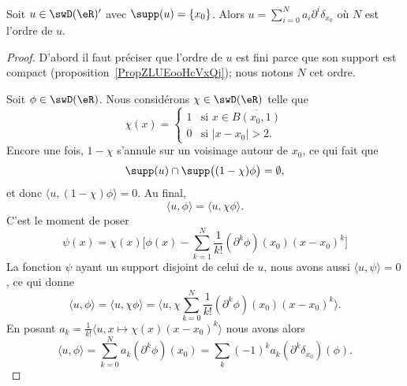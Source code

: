 \begin{proposition}     \label{PropXXPLooSkgxOz}
	Soit \( u\in\swD(\eR)'\) avec \( \supp(u)=\{ x_0 \}\). Alors \( u=\sum_{i=0}^{N}a_i\partial^i\delta_{x_0}\) où \( N\) est l'ordre de \( u\).
\end{proposition}

\begin{proof}
	D'abord il faut préciser que l'ordre de \( u\) est fini parce que son support est compact (proposition~\ref{PropZLUEooHcVxQj}); nous notons \( N\) cet ordre.

	Soit \( \phi\in\swD(\eR)\).  Nous considérons \( \chi\in\swD(\eR)\) telle que
	\begin{equation}
		\chi(x)=\begin{cases}
			1 & \text{si } x\in\overline{ B(x_0,1) } \\
			0 & \text{si } | x-x_0 |>2.
		\end{cases}
	\end{equation}
	Encore une fois, \( 1-\chi\) s'annule sur un voisinage autour de \( x_0\), ce qui fait que
	\begin{equation}
		\supp(u)\cap\supp\big( (1-\chi)\phi \big)=\emptyset,
	\end{equation}
	et donc \( \langle u, (1-\chi)\phi\rangle =0\). Au final,
	\begin{equation}
		\langle u, \phi\rangle =\langle u, \chi\phi\rangle.
	\end{equation}
	C'est le moment de poser
	\begin{equation}
		\psi(x)=\chi(x)\big[   \phi(x)-\sum_{k=1}^N\frac{1}{ k! }(\partial^k\phi)(x_0)(x-x_0)^k \big]
	\end{equation}
	La fonction \( \psi\) ayant un support disjoint de celui de \( u\), nous avons aussi \( \langle u, \psi\rangle =0\), ce qui donne
	\begin{equation}
		\langle u, \phi\rangle =\langle u, \chi\phi\rangle =\langle u, \chi\sum_{k=0}^N\frac{1}{ k! }(\partial^k\phi)(x_0)(x-x_0)^k\rangle .
	\end{equation}
	En posant \( a_k=\frac{1}{ k! }\langle u, x\mapsto \chi(x)(x-x_0)^k\rangle \) nous avons alors
	\begin{equation}
		\langle u, \phi\rangle =\sum_{k=0}^Na_k(\partial^k\phi)(x_0)=\sum_k(-1)^ka_k(\partial^k\delta_{x_0})(\phi).
	\end{equation}
\end{proof}

